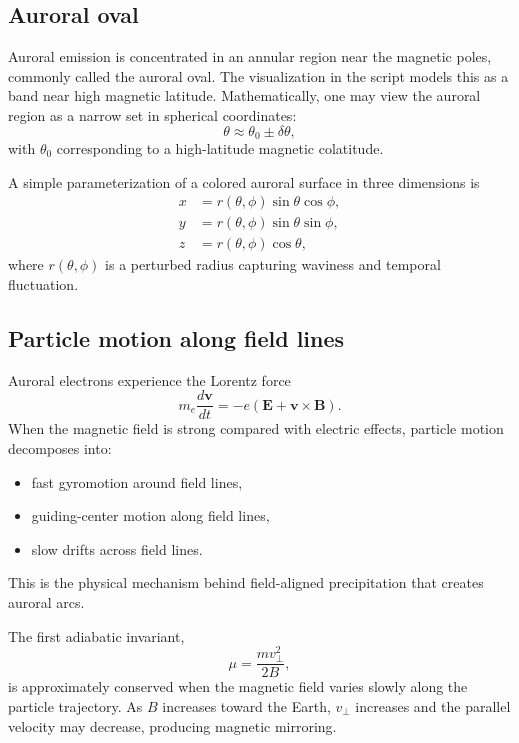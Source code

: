 \documentclass[11pt]{article}
\begin{document}
\subsection{Auroral oval}
Auroral emission is concentrated in an annular region near the magnetic poles, commonly called the auroral oval. The visualization in the script models this as a band near high magnetic latitude. Mathematically, one may view the auroral region as a narrow set in spherical coordinates:
\begin{equation}
\theta \approx \theta_0 \pm \delta\theta,
\end{equation}
with \(\theta_0\) corresponding to a high-latitude magnetic colatitude.

A simple parameterization of a colored auroral surface in three dimensions is
\begin{align}
x &= r(\theta,\phi)\sin\theta\cos\phi, \\
y &= r(\theta,\phi)\sin\theta\sin\phi, \\
z &= r(\theta,\phi)\cos\theta,
\end{align}
where \(r(\theta,\phi)\) is a perturbed radius capturing waviness and temporal fluctuation.

\subsection{Particle motion along field lines}
Auroral electrons experience the Lorentz force
\begin{equation}
m_e \frac{d\bm{v}}{dt} = -e\left(\bm{E} + \bm{v}\times\bm{B}\right).
\end{equation}
When the magnetic field is strong compared with electric effects, particle motion decomposes into:
\begin{itemize}
    \item fast gyromotion around field lines,
    \item guiding-center motion along field lines,
    \item slow drifts across field lines.
\end{itemize}
This is the physical mechanism behind field-aligned precipitation that creates auroral arcs.

The first adiabatic invariant,
\begin{equation}
\mu = \frac{m v_\perp^2}{2B},
\end{equation}
is approximately conserved when the magnetic field varies slowly along the particle trajectory. As \(B\) increases toward the Earth, \(v_\perp\) increases and the parallel velocity may decrease, producing magnetic mirroring.
\end{document}

